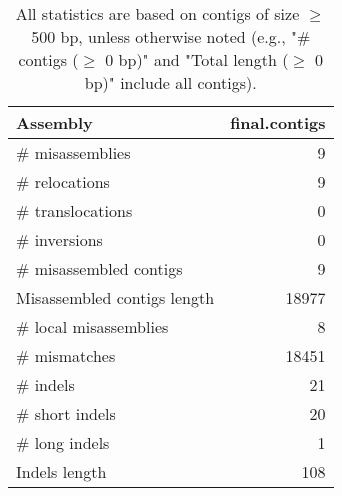 \documentclass[12pt,a4paper]{article}
\begin{document}
\begin{table}[ht]
\begin{center}
\caption{All statistics are based on contigs of size $\geq$ 500 bp, unless otherwise noted (e.g., "\# contigs ($\geq$ 0 bp)" and "Total length ($\geq$ 0 bp)" include all contigs).}
\begin{tabular}{|l*{1}{|r}|}
\hline
Assembly & final.contigs \\ \hline
\# misassemblies & 9 \\ \hline
\hspace{5mm}\# relocations & 9 \\ \hline
\hspace{5mm}\# translocations & 0 \\ \hline
\hspace{5mm}\# inversions & 0 \\ \hline
\# misassembled contigs & 9 \\ \hline
Misassembled contigs length & 18977 \\ \hline
\# local misassemblies & 8 \\ \hline
\# mismatches & 18451 \\ \hline
\# indels & 21 \\ \hline
\hspace{5mm}\# short indels & 20 \\ \hline
\hspace{5mm}\# long indels & 1 \\ \hline
Indels length & 108 \\ \hline
\end{tabular}
\end{center}
\end{table}
\end{document}
